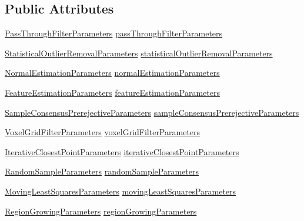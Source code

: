 \subsection*{Public Attributes}
\begin{DoxyCompactItemize}
\item 
\hyperlink{classPassThroughFilterParameters}{Pass\-Through\-Filter\-Parameters} \hyperlink{classInputParameters_a8c71942292cf5e68730570b463c618de}{pass\-Through\-Filter\-Parameters}
\item 
\hyperlink{classStatisticalOutlierRemovalParameters}{Statistical\-Outlier\-Removal\-Parameters} \hyperlink{classInputParameters_a90906b162bbde5ff620e8cdbe0c0bf5e}{statistical\-Outlier\-Removal\-Parameters}
\item 
\hyperlink{classNormalEstimationParameters}{Normal\-Estimation\-Parameters} \hyperlink{classInputParameters_a1941afbe5f0410d51a79b218ddb4b066}{normal\-Estimation\-Parameters}
\item 
\hyperlink{classFeatureEstimationParameters}{Feature\-Estimation\-Parameters} \hyperlink{classInputParameters_a93d04e1a89ea194bb49cf41f8d931524}{feature\-Estimation\-Parameters}
\item 
\hyperlink{classSampleConsensusPrerejectiveParameters}{Sample\-Consensus\-Prerejective\-Parameters} \hyperlink{classInputParameters_aad5e2d822f8ad4bcfc14039166df6c7e}{sample\-Consensus\-Prerejective\-Parameters}
\item 
\hyperlink{classVoxelGridFilterParameters}{Voxel\-Grid\-Filter\-Parameters} \hyperlink{classInputParameters_af0ae91d8cb32b5b6ba9563166c201f4f}{voxel\-Grid\-Filter\-Parameters}
\item 
\hyperlink{classIterativeClosestPointParameters}{Iterative\-Closest\-Point\-Parameters} \hyperlink{classInputParameters_a3f2d02a51290e1fd0c301f1e78dc37c5}{iterative\-Closest\-Point\-Parameters}
\item 
\hyperlink{classRandomSampleParameters}{Random\-Sample\-Parameters} \hyperlink{classInputParameters_a8c112b237ebe18d0a259dc2a4078ed9a}{random\-Sample\-Parameters}
\item 
\hyperlink{classMovingLeastSquaresParameters}{Moving\-Least\-Squares\-Parameters} \hyperlink{classInputParameters_af1b730eac96f634d3235f37495d6dcf9}{moving\-Least\-Squares\-Parameters}
\item 
\hyperlink{classRegionGrowingParameters}{Region\-Growing\-Parameters} \hyperlink{classInputParameters_a79916cd8f1f6348d1cd1d92dffa58da1}{region\-Growing\-Parameters}
\item 

\end{DoxyCompactItemize}
